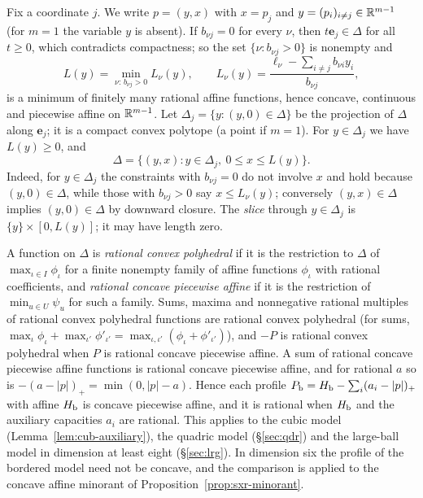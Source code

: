Fix a coordinate $j$. We write $p=(y,x)$ with $x=p_j$ and $y=(p_i)_{i\ne j}\in\mathbb{R}^{m-1}$ (for $m=1$ the variable $y$
is absent). If $b_{\nu j}=0$ for every $\nu$, then $t\mathbf e_j\in\Delta$ for all $t\ge0$, which contradicts
compactness; so the set $\{\nu:b_{\nu j}>0\}$ is nonempty and
\[
 L(y)=\min_{\nu:\,b_{\nu j}>0}L_\nu(y),\qquad L_\nu(y)=\frac{\ell_\nu-\sum_{i\ne j}b_{\nu i}y_i}{b_{\nu j}},
\]
is a minimum of finitely many rational affine functions, hence concave, continuous and piecewise affine on
$\mathbb{R}^{m-1}$. Let $\Delta_j=\{y:(y,0)\in\Delta\}$ be the projection of $\Delta$ along $\mathbf e_j$; it is a compact
convex polytope (a point if $m=1$). For $y\in\Delta_j$ we have $L(y)\ge0$, and
\begin{equation}\label{eq:fcp-slices}
 \Delta=\{(y,x):y\in\Delta_j,\ 0\le x\le L(y)\}.
\end{equation}
Indeed, for $y\in\Delta_j$ the constraints with $b_{\nu j}=0$ do not involve $x$ and hold because $(y,0)\in\Delta$,
while those with $b_{\nu j}>0$ say $x\le L_\nu(y)$; conversely $(y,x)\in\Delta$ implies $(y,0)\in\Delta$ by downward
closure. The \emph{slice} through $y\in\Delta_j$ is $\{y\}\times[0,L(y)]$; it may have length zero.

A function on $\Delta$ is \emph{rational convex polyhedral} if it is the restriction to $\Delta$ of
$\max_{\iota\in I}\phi_\iota$ for a finite nonempty family of affine functions $\phi_\iota$ with rational coefficients,
and \emph{rational concave piecewise affine} if it is the restriction of $\min_{u\in U}\psi_u$ for such a family. Sums,
maxima and nonnegative rational multiples of rational convex polyhedral functions are rational convex polyhedral (for
sums, $\max_\iota\phi_\iota+\max_{\iota'}\phi'_{\iota'}=\max_{\iota,\iota'}(\phi_\iota+\phi'_{\iota'})$), and $-P$ is
rational convex polyhedral when $P$ is rational concave piecewise affine. A sum of rational concave piecewise affine
functions is rational concave piecewise affine, and for rational $a$ so is $-(a-|p|)_+=\min(0,|p|-a)$. Hence each
profile $P_{\mathrm b}=H_{\mathrm b}-\sum_i(a_i-|p|)_+$ with affine $H_{\mathrm b}$ is concave piecewise affine, and it is rational when $H_{\mathrm b}$ and the
auxiliary capacities $a_i$ are rational. This applies to the cubic model (Lemma~\ref{lem:cub-auxiliary}), the quadric
model (\S\ref{sec:qdr}) and the large-ball model in dimension at least eight (\S\ref{sec:lrg}). In dimension six the
profile of the bordered model need not be concave, and the comparison is applied to the concave affine minorant of
Proposition~\ref{prop:sxr-minorant}.


